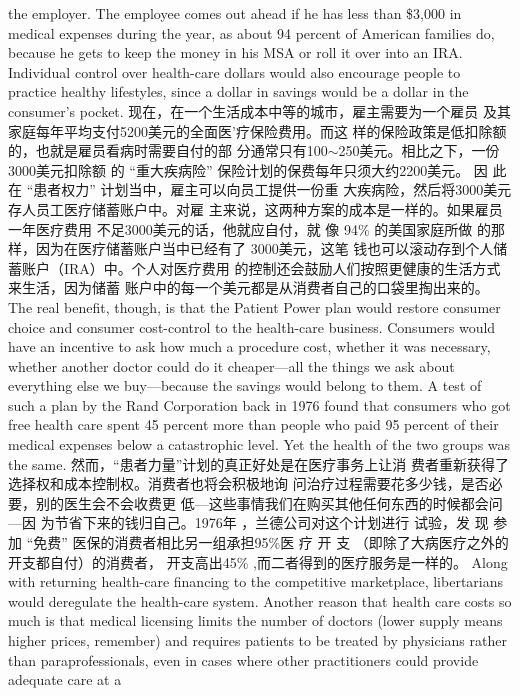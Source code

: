 \begin{paracol}{2}
the employer. The employee comes out ahead if he has less than
\$3,000 in medical expenses during the year, as about 94 percent of American families do, because he gets to keep the
money in his MSA or roll it over into an IRA. Individual control
over health-care dollars would also encourage people to practice healthy lifestyles, since a dollar in savings would be a dollar in
the consumer's pocket.
\switchcolumn
现在，在一个生活成本中等的城市，雇主需要为一个雇员
及其家庭每年平均支付5200美元的全面医'疗保险费用。而这
样的保险政策是低扣除额的，也就是雇员看病时需要自付的部
分通常只有100$\sim$250美元。相比之下，一份 3000美元扣除额
的 “重大疾病险” 保险计划的保费每年只须大约2200美元。
因 此 在 “患者权力” 计划当中，雇主可以向员工提供一份重
大疾病险，然后将3000美元存人员工医疗储蓄账户中。对雇
主来说，这两种方案的成本是一样的。如果雇员一年医疗费用
不足3000美元的话，他就应自付，就 像 94\% 的美国家庭所做
的那样，因为在医疗储蓄账户当中已经有了 3000美元，这笔
钱也可以滚动存到个人储蓄账户（IRA）中。个人对医疗费用
的控制还会鼓励人们按照更健康的生活方式来生活，因为储蓄
账户中的每一个美元都是从消费者自己的口袋里掏出来的。
\switchcolumn*
The real benefit, though, is that the Patient Power plan
would restore consumer choice and consumer cost-control to
the health-care business. Consumers would have an incentive to
ask how much a procedure cost, whether it was necessary,
whether another doctor could do it cheaper---all the things we
ask about everything else we buy---because the savings would
belong to them. A test of such a plan by the Rand Corporation
back in 1976 found that consumers who got free health care
spent 45 percent more than people who paid 95 percent of their
medical expenses below a catastrophic level. Yet the health of
the two groups was the same.
\switchcolumn
然而，“患者力量”计划的真正好处是在医疗事务上让消
费者重新获得了选择权和成本控制权。消费者也将会积极地询
问治疗过程需要花多少钱，是否必要，别的医生会不会收费更
低---这些事情我们在购买其他任何东西的时候都会问---因
为节省下来的钱归自己。1976年 ，兰德公司对这个计划进行
试验，发 现 参 加 “免费” 医保的消费者相比另一组承担95\%医 疗 开 支 （即除了大病医疗之外的开支都自付）的消费者，
开支高出45\% ,而二者得到的医疗服务是一样的。
\switchcolumn*
Along with returning health-care financing to the competitive marketplace, libertarians would deregulate the health-care
system. Another reason that health care costs so much is that
medical licensing limits the number of doctors (lower supply
means higher prices, remember) and requires patients to be
treated by physicians rather than paraprofessionals, even in
cases where other practitioners could provide adequate care at a

\end{paracol}
